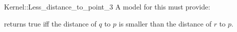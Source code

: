 \begin{ccRefFunctionObjectConcept}{Kernel::Less_distance_to_point_3}
A model for this must provide:


{returns true iff the distance of $q$ to $p$ is
smaller than the distance of $r$ to $p$.}

\end{ccRefFunctionObjectConcept}

